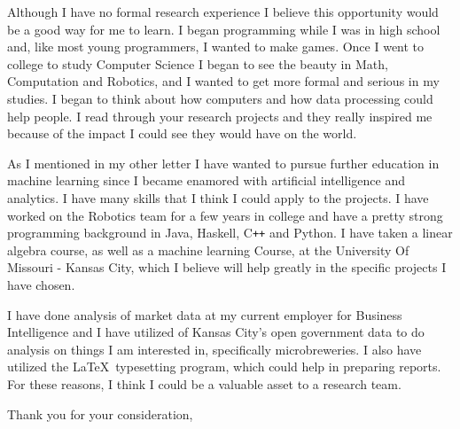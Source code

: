 \documentclass{letter}
\begin{document}
Although I have no formal research experience I believe this opportunity would be a good way for me to learn. I began programming while I was in high school and, like most young programmers, I wanted to make games. Once I went to college to study Computer Science I began to see the beauty in Math, Computation and Robotics, and I wanted to get more formal and serious in my studies. I began to think about how computers and how data processing could help people. I read through your research projects and they really inspired me because of the impact I could see they would have on the world.

As I mentioned in my other letter I have wanted to pursue further education in machine learning since I became enamored with artificial intelligence and analytics. I have many skills that I think I could apply to the projects. I have worked on the Robotics team for a few years in college and have a pretty strong programming background in Java, Haskell, C\texttt{++} and Python. I have taken a linear algebra course, as well as a machine learning Course, at the University Of Missouri - Kansas City, which I believe will help greatly in the specific projects I have chosen.

I have done analysis of market data at my current employer for Business Intelligence and I have utilized of Kansas City's open government data to do analysis on things I am interested in, specifically microbreweries. I also have utilized the \LaTeX\ typesetting program, which could help in preparing reports.  For these reasons, I think I could be a valuable asset to a research team.

\closing{Thank you for your consideration,}
\end{document}
